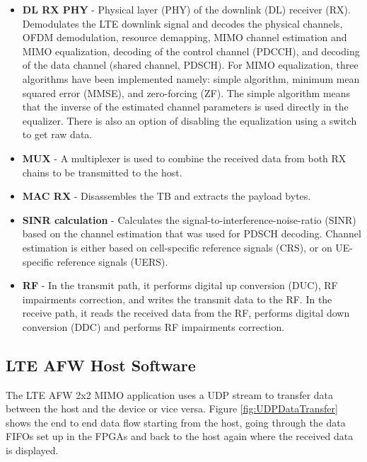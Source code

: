 \begin{itemize}
    \item \textbf{DL RX PHY} -
        Physical layer (PHY) of the downlink (DL) receiver (RX). Demodulates the LTE downlink signal and decodes the physical channels, OFDM demodulation, resource demapping, MIMO channel estimation and MIMO equalization, decoding of the control channel (PDCCH), and decoding of the data channel (shared channel, PDSCH). For MIMO equalization, three algorithms have been implemented namely: simple algorithm, minimum mean squared error (MMSE), and zero-forcing (ZF). The simple algorithm means that the inverse of the estimated channel parameters is used directly in the equalizer. There is also an option of disabling the equalization using a switch to get raw data.
    \item \textbf{MUX} -
        A multiplexer is used to combine the received data from both RX chains to be transmitted to the host.
    \item \textbf{MAC RX} -
        Disassembles the TB and extracts the payload bytes.
    \item \textbf{SINR calculation} -
        Calculates the signal-to-interference-noise-ratio (SINR) based on the channel estimation that was used for PDSCH decoding. Channel estimation is either based on cell-specific reference signals (CRS), or on UE-specific reference signals (UERS).
    \item \textbf{RF} -
        In the transmit path, it performs digital up conversion (DUC), RF impairments correction, and writes the transmit data to the RF. In the receive path, it reads the received data from the RF, performs digital down conversion (DDC) and performs RF impairments correction.
\end{itemize}


\subsection{LTE AFW Host Software}\label{ssec:LTEAFWHostSW}
The LTE AFW 2x2 MIMO application uses a UDP stream to transfer data between the host and the device or vice versa. Figure \ref{fig:UDPDataTransfer} shows the end to end data flow starting from the host, going through the data FIFOs set up in the FPGAs and back to the host again where the received data is displayed.

